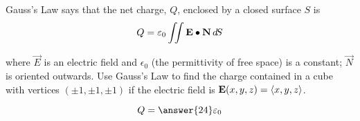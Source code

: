 \documentclass{ximera}
\author{David Guichard \and Neal Koblitz \and H. Jerome Keisler \and Albert Scheller \and Barry Balof \and Mike Wills \and Matthew Carr}
\begin{document}
\begin{exercise}




Gauss's Law says that the net charge, $Q$, enclosed by a closed surface $S$ is
\[
Q=\varepsilon_0 \iint\mathbf{E}\bullet\mathbf{N}\mathop{}\!d\! S
\]

where $\vec{E}$ is an electric field and $\epsilon_0$ (the permittivity of free space) is a constant; $\vec{N}$ is oriented outwards. Use Gauss's Law to find the charge contained in a cube with vertices $(\pm 1, \pm 1,\pm 1)$ if the electric field is $\mathbf{E}(x,y,z)=\left\langle x,y,z\right\rangle$.

\begin{prompt}
\[
Q=\answer{24}\epsilon_{0}
\]
\end{prompt}


\end{exercise}
\end{document}
